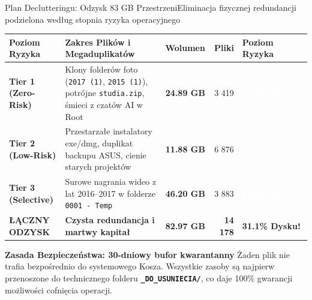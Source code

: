 \documentclass[aspectratio=169, 10pt]{beamer}
\newcommand{\badge}[2]{{\setlength{\fboxsep}{2pt}\colorbox{#1}{\textcolor{white}{\sffamily\bfseries\tiny #2}}}}
\newcommand{\okTag}[1]{{\badge{brandGreen}{#1}}}
\newcommand{\infoTag}[1]{{\badge{brandBlue}{#1}}}
\newcommand{\warnTag}[1]{{\badge{brandOrange}{#1}}}
\begin{document}
\begin{frame}{Plan Declutteringu: Odzysk 83 GB Przestrzeni}{Eliminacja fizycznej redundancji podzielona według stopnia ryzyka operacyjnego}
  \begin{center}
    \small
    \begin{tabularx}{\textwidth}{lp{6.2cm}rrl}
      \toprule
      \textbf{Poziom Ryzyka} & \textbf{Zakres Plików i Megaduplikatów} & \textbf{Wolumen} & \textbf{Pliki} & \textbf{Poziom Ryzyka} \\
      \midrule
      \textbf{Tier 1 (Zero-Risk)} & Klony folderów foto (\texttt{2017 (1)}, \texttt{2015 (1)}), potrójne \texttt{studia.zip}, śmieci z czatów AI w Root & \textbf{24.89 GB} & 3 419 & \okTag{ZEROWE} \\
      \addlinespace
      \textbf{Tier 2 (Low-Risk)} & Przestarzałe instalatory exe/dmg, duplikat backupu ASUS, cienie starych projektów & \textbf{11.88 GB} & 6 876 & \infoTag{MINIMALNE} \\
      \addlinespace
      \textbf{Tier 3 (Selective)} & Surowe nagrania wideo z lat 2016--2017 w folderze \texttt{0001 - Temp} & \textbf{46.20 GB} & 3 883 & \warnTag{ŚREDNIE} \\
      \midrule
      \textbf{ŁĄCZNY ODZYSK} & \textbf{Czysta redundancja i martwy kapitał} & \textbf{82.97 GB} & \textbf{14 178} & \textbf{31.1\% Dysku!} \\
      \bottomrule
    \end{tabularx}
  \end{center}

  \vspace{0.2cm}
  \begin{alertblock}{\textbf{Zasada Bezpieczeństwa: 30-dniowy bufor kwarantanny}}
    \footnotesize
    Żaden plik nie trafia bezpośrednio do systemowego Kosza. Wszystkie zasoby są najpierw przenoszone do technicznego folderu \textbf{\texttt{\_DO\_USUNIECIA/}}, co daje 100\% gwarancji możliwości cofnięcia operacji.
  \end{alertblock}
\end{frame}
\end{document}
